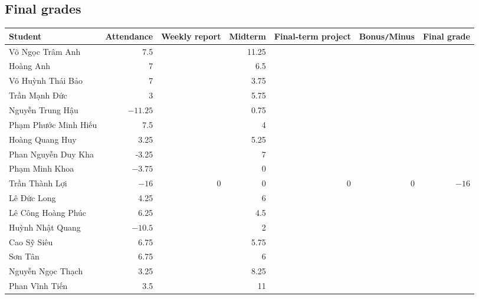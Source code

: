 \documentclass{article}
\begin{document}

\subsection{Final grades}

\begin{table}[H]
    \centering
    \begin{tabular}{|l|r|r|r|r|r|r|}
        \hline
        Student & Attendance & Weekly report & Midterm & Final-term project & Bonus{\tt/}Minus & Final grade \\
        \hline
        {\sc Võ Ngọc Trâm Anh} & 7.5 &  & 11.25 &  &  &  \\
        \hline
        {\sc Hoàng Anh} & 7 &  & 6.5 &  &  &  \\
        \hline
        {\sc Võ Huỳnh Thái Bảo} & 7 &  & 3.75 &  &  &  \\
        \hline
        {\sc Trần Mạnh Đức} & 3 &  & 5.75 &  &  &  \\
        \hline
        {\sc Nguyễn Trung Hậu} & $-11.25$ &  & 0.75 &  &  &  \\
        \hline
        {\sc Phạm Phước Minh Hiếu} & 7.5 &  & 4 &  &  &  \\
        \hline
        {\sc Hoàng Quang Huy} & 3.25 &  & 5.25 &  &  &  \\
        \hline
        {\sc Phan Nguyễn Duy Kha} & -3.25 &  & 7 &  &  &  \\
        \hline
        {\sc Phạm Minh Khoa} & $-3.75$ &  & 0 &  &  &  \\
        \hline
        {\sc Trần Thành Lợi} & $-16$ & 0 & 0 & 0 & 0 & $-16$ \\
        \hline
        {\sc Lê Đức Long} & 4.25 &  & 6 &  &  &  \\
        \hline
        {\sc Lê Công Hoàng Phúc} & 6.25 & & 4.5 &  &  &  \\
        \hline
        {\sc Huỳnh Nhật Quang} & $-10.5$ &  & 2 &  &  &  \\
        \hline
        {\sc Cao Sỹ Siêu} & 6.75 &  & 5.75 &  &  &  \\
        \hline
        {\sc Sơn Tân} & 6.75 &  & 6 &  &  &  \\
        \hline
        {\sc Nguyễn Ngọc Thạch} & 3.25 &  & 8.25 &  &  &  \\
        \hline
        {\sc Phan Vĩnh Tiến} & 3.5 &  & 11 &  &  &  \\
        \hline
    \end{tabular}
\end{table}

\end{document}
